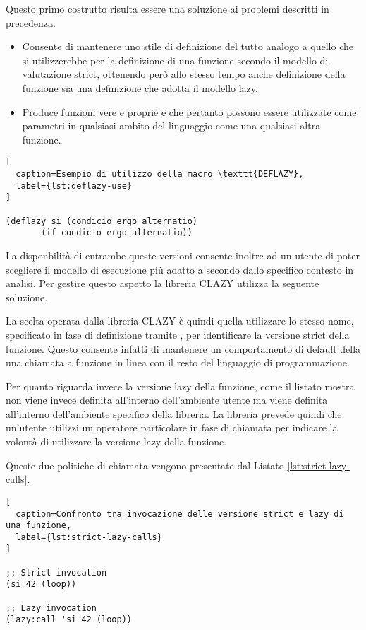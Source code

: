 Questo primo costrutto risulta essere una soluzione ai problemi descritti in precedenza.

\begin{itemize}

\item Consente di mantenere uno stile di definizione del tutto analogo a quello che si utilizzerebbe per la definizione di una funzione secondo il modello di valutazione strict, ottenendo però allo stesso tempo anche definizione della funzione sia una definizione che adotta il modello lazy.

\item Produce funzioni vere e proprie e che pertanto possono essere utilizzate come parametri in qualsiasi ambito del linguaggio come una qualsiasi altra funzione.

\end{itemize}

\begin{lstlisting}[
  caption=Esempio di utilizzo della macro \texttt{DEFLAZY},
  label={lst:deflazy-use}
]

(deflazy si (condicio ergo alternatio)
       (if condicio ergo alternatio))

\end{lstlisting}

La disponbilità di entrambe queste versioni consente inoltre ad un utente di poter scegliere il modello di esecuzione più adatto a secondo dallo specifico contesto in analisi. Per gestire questo aspetto la libreria CLAZY utilizza la seguente soluzione.

La scelta operata dalla libreria CLAZY è quindi quella utilizzare lo stesso nome, specificato in fase di definizione tramite , per identificare la versione strict della funzione. Questo consente infatti di mantenere un comportamento di default della una chiamata a funzione in linea con il resto del linguaggio di programmazione.

Per quanto riguarda invece la versione lazy della funzione, come il listato mostra non viene invece definita all'interno dell'ambiente utente ma viene definita all'interno dell'ambiente specifico della libreria. La libreria prevede quindi che un'utente utilizzi un operatore particolare in fase di chiamata per indicare la volontà di utilizzare la versione lazy della funzione.

Queste due politiche di chiamata vengono presentate dal Listato \ref{lst:strict-lazy-calls}.

\begin{lstlisting}[
  caption=Confronto tra invocazione delle versione strict e lazy di una funzione,
  label={lst:strict-lazy-calls}
]

;; Strict invocation
(si 42 (loop))

;; Lazy invocation
(lazy:call 'si 42 (loop))

\end{lstlisting}

